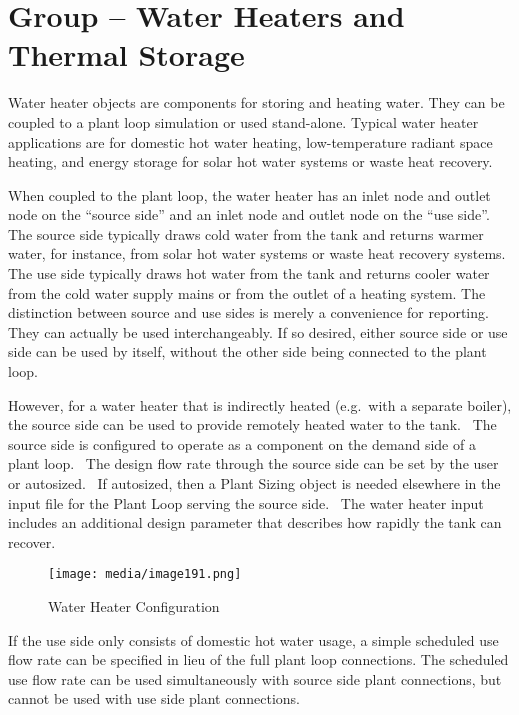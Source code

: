 \section{Group -- Water Heaters and Thermal Storage}\label{group-water-heaters}

Water heater objects are components for storing and heating water. They can be coupled to a plant loop simulation or used stand-alone. Typical water heater applications are for domestic hot water heating, low-temperature radiant space heating, and energy storage for solar hot water systems or waste heat recovery.

When coupled to the plant loop, the water heater has an inlet node and outlet node on the ``source side'' and an inlet node and outlet node on the ``use side''. The source side typically draws cold water from the tank and returns warmer water, for instance, from solar hot water systems or waste heat recovery systems. The use side typically draws hot water from the tank and returns cooler water from the cold water supply mains or from the outlet of a heating system. The distinction between source and use sides is merely a convenience for reporting. They can actually be used interchangeably. If so desired, either source side or use side can be used by itself, without the other side being connected to the plant loop.

However, for a water heater that is indirectly heated (e.g.~with a separate boiler), the source side can be used to provide remotely heated water to the tank.~ The source side is configured to operate as a component on the demand side of a plant loop.~ The design flow rate through the source side can be set by the user or autosized.~ If autosized, then a Plant Sizing object is needed elsewhere in the input file for the Plant Loop serving the source side.~ The water heater input includes an additional design parameter that describes how rapidly the tank can recover.

\begin{figure}[hbtp] %
\centering
\texttt{[image: media/image191.png]}
\caption{Water Heater Configuration \protect \label{fig:water-heater-configuration}}
\end{figure}

If the use side only consists of domestic hot water usage, a simple scheduled use flow rate can be specified in lieu of the full plant loop connections. The scheduled use flow rate can be used simultaneously with source side plant connections, but cannot be used with use side plant connections.

